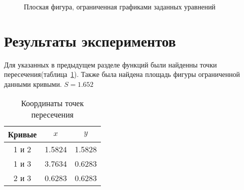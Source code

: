 \documentclass[a4paper,12pt,titlepage,finall]{article}
\begin{document}
\begin{figure}[h]
\centering
{}
\caption{Плоская фигура, ограниченная графиками заданных уравнений}
\label{plot1}
\end{figure}

\newpage

\section{Результаты экспериментов}

Для указанных в предыдущем разделе функций были найденны точки пересечения(таблица~\ref{table1}). Также была найдена площадь фигуры ограниченной данными кривыми. {$S=1.652$}

\begin{table}[h]
\centering
\begin{tabular}{|c|c|c|}
\hline
Кривые & $x$ & $y$ \\
\hline
1 и 2 &  1.5824 & 1.5828 \\
1 и 3 &  3.7634 & 0.6283 \\
2 и 3 &  0.6283 & 0.6283 \\
\hline
\end{tabular}
\caption{Координаты точек пересечения}
\label{table1}
\end{table}
\end{document}

